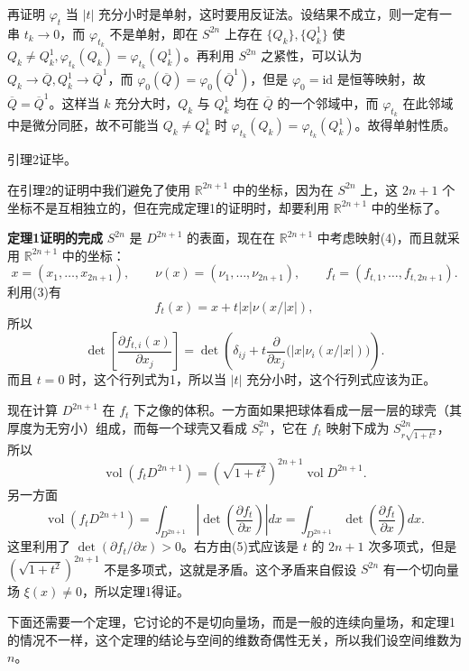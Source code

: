再证明 $\varphi_t$ 当 $|t|$ 充分小时是单射，这时要用反证法。设结果不成立，则一定有一串 $t_k\to0$，而 $\varphi_{t_k}$ 不是单射，即在 $S^{2n}$ 上存在 $\{Q_k\},\{Q_k^1\}$ 使 $Q_k\ne Q_k^1,\varphi_{t_k}(Q_k)=\varphi_{t_k}(Q_k^1)$。再利用 $S^{2n}$ 之紧性，可以认为 $Q_k\to\overline Q,Q_k^1\to\overline Q^1$，而 $\varphi_0(\overline Q)=\varphi_0(\overline Q^1)$，但是 $\varphi_0=\mathrm{id}$ 是恒等映射，故 $\overline Q=\overline Q^1$。这样当 $k$ 充分大时，$Q_k$ 与 $Q_k^1$ 均在 $\overline Q$ 的一个邻域中，而 $\varphi_{t_k}$ 在此邻域中是微分同胚，故不可能当 $Q_k\ne Q_k^1$ 时 $\varphi_{t_k}(Q_k)=\varphi_{t_k}(Q_k^1)$。故得单射性质。

引理2证毕。

在引理2的证明中我们避免了使用 $\mathbb R^{2n+1}$ 中的坐标，因为在 $S^{2n}$ 上，这 $2n+1$ 个坐标不是互相独立的，但在完成定理1的证明时，却要利用 $\mathbb R^{2n+1}$ 中的坐标了。

\noindent\textbf{定理1证明的完成}\quad
$S^{2n}$ 是 $D^{2n+1}$ 的表面，现在在 $\mathbb R^{2n+1}$ 中考虑映射(4)，而且就采用 $\mathbb R^{2n+1}$ 中的坐标：\[
x=(x_1,\ldots,x_{2n+1}),\qquad \nu(x)=(\nu_1,\ldots,\nu_{2n+1}),\qquad f_t=(f_{t,1},\ldots,f_{t,2n+1}).
\]
利用(3)有
\[
 f_t(x)=x+t|x|\nu(x/|x|),
\]
所以
\begin{equation}
 \det\left[\frac{\partial f_{t,i}(x)}{\partial x_j}\right]
 =\det\left(\delta_{ij}+t\frac{\partial}{\partial x_j}\bigl(|x|\nu_i(x/|x|)\bigr)\right).
 \tag{5}
\end{equation}
而且 $t=0$ 时，这个行列式为1，所以当 $|t|$ 充分小时，这个行列式应该为正。

现在计算 $D^{2n+1}$ 在 $f_t$ 下之像的体积。一方面如果把球体看成一层一层的球壳（其厚度为无穷小）组成，而每一个球壳又看成 $S_r^{2n}$，它在 $f_t$ 映射下成为 $S_{r\sqrt{1+t^2}}^{2n}$，所以
\begin{equation}
 \operatorname{vol}(f_tD^{2n+1})=(\sqrt{1+t^2})^{2n+1}\operatorname{vol}D^{2n+1}.
 \tag{6}
\end{equation}
另一方面
\[
 \operatorname{vol}(f_tD^{2n+1})
 =\int_{D^{2n+1}}\left|\det\left(\frac{\partial f_t}{\partial x}\right)\right|dx
 =\int_{D^{2n+1}}\det\left(\frac{\partial f_t}{\partial x}\right)dx.
\]
这里利用了 $\det(\partial f_t/\partial x)>0$。右方由(5)式应该是 $t$ 的 $2n+1$ 次多项式，但是 $(\sqrt{1+t^2})^{2n+1}$ 不是多项式，这就是矛盾。这个矛盾来自假设 $S^{2n}$ 有一个切向量场 $\xi(x)\ne0$，所以定理1得证。

下面还需要一个定理，它讨论的不是切向量场，而是一般的连续向量场，和定理1的情况不一样，这个定理的结论与空间的维数奇偶性无关，所以我们设空间维数为 $n$。

